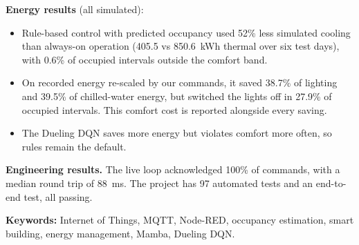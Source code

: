 \documentclass[12pt,a4paper,oneside]{report}
\begin{document}
\textbf{Energy results} (all simulated):
\begin{itemize}
\item Rule-based control with predicted occupancy used 52\% less simulated cooling than always-on operation (405.5 vs
  850.6~kWh thermal over six test days), with 0.6\% of occupied intervals outside the comfort band.
\item On recorded energy re-scaled by our commands, it saved 38.7\% of lighting and 39.5\% of chilled-water energy,
  but switched the lights off in 27.9\% of occupied intervals. This comfort cost is reported alongside every saving.
\item The Dueling DQN saves more energy but violates comfort more often, so rules remain the default.
\end{itemize}

\textbf{Engineering results.} The live loop acknowledged 100\% of commands, with a median round trip of 88~ms. The
project has 97 automated tests and an end-to-end test, all passing.

\vspace{4mm}
\noindent\textbf{Keywords:} Internet of Things, MQTT, Node-RED, occupancy estimation, smart building, energy
management, Mamba, Dueling DQN.

\tableofcontents
\clearpage
\listoffigures
\clearpage
\listoftables
\clearpage
\end{document}
